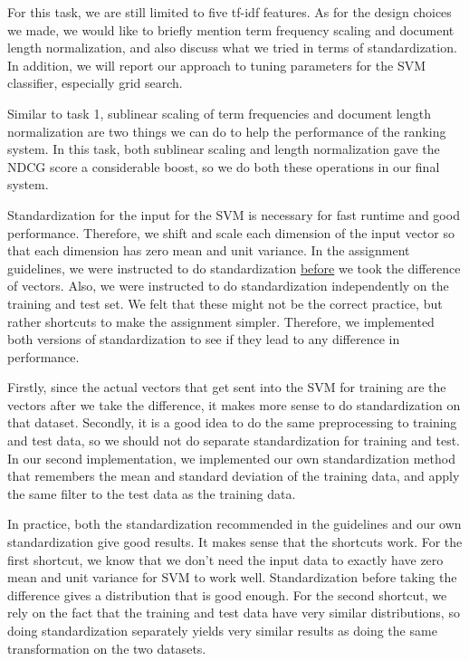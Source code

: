 \documentclass[10pt,twocolumn]{article}
\begin{document}
For this task, we are still limited to five tf-idf features. As for the design choices we made, we would like to briefly mention term frequency scaling and document length normalization, and also discuss what we tried in terms of standardization. In addition, we will report our approach to tuning parameters for the SVM classifier, especially grid search.

Similar to task 1, sublinear scaling of term frequencies and document length normalization are two things we can do to help the performance of the ranking system. In this task, both sublinear scaling and length normalization gave the NDCG score a considerable boost, so we do both these operations in our final system.

Standardization for the input for the SVM is necessary for fast runtime and good performance. Therefore, we shift and scale each dimension of the input vector so that each dimension has zero mean and unit variance. In the assignment guidelines, we were instructed to do standardization \underline{before} we took the difference of vectors. Also, we were instructed to do standardization independently on the training and test set. We felt that these might not be the correct practice, but rather shortcuts to make the assignment simpler. Therefore, we implemented both versions of standardization to see if they lead to any difference in performance.

Firstly, since the actual vectors that get sent into the SVM for training are the vectors after we take the difference, it makes more sense to do standardization on that dataset. Secondly, it is a good idea to do the same preprocessing to training and test data, so we should not do separate standardization for training and test. In our second implementation, we implemented our own standardization method that remembers the mean and standard deviation of the training data, and apply the same filter to the test data as the training data.

In practice, both the standardization recommended in the guidelines and our own standardization give good results. It makes sense that the shortcuts work. For the first shortcut, we know that we don't need the input data to exactly have zero mean and unit variance for SVM to work well. Standardization before taking the difference gives a distribution that is good enough. For the second shortcut, we rely on the fact that the training and test data have very similar distributions, so doing standardization separately yields very similar results as doing the same transformation on the two datasets.
\end{document}
